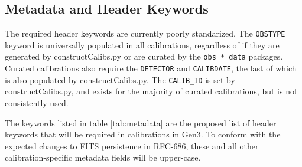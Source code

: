 \documentclass[DM,authoryear,toc]{lsstdoc}
\begin{document}
\subsection{Metadata and Header Keywords}

The required header keywords are currently poorly standarized.  The
\verb|OBSTYPE| keyword is universally populated in all calibrations,
regardless of if they are generated by constructCalibs.py or are
curated by the \verb|obs_*_data| packages.  Curated calibrations also
require the \verb|DETECTOR| and \verb|CALIBDATE|, the last of which is
also populated by constructCalibs.py.  The \verb|CALIB_ID| is set by
constructCalibs.py, and exists for the majority of curated
calibrations, but is not consistently used.

The keywords listed in table \ref{tab:metadata} are the proposed list
of header keywords that will be required in calibrations in Gen3.  To
conform with the expected changes to FITS persistence in RFC-686,
these and all other calibration-specific metadata fields will be
upper-case.
\end{document}
